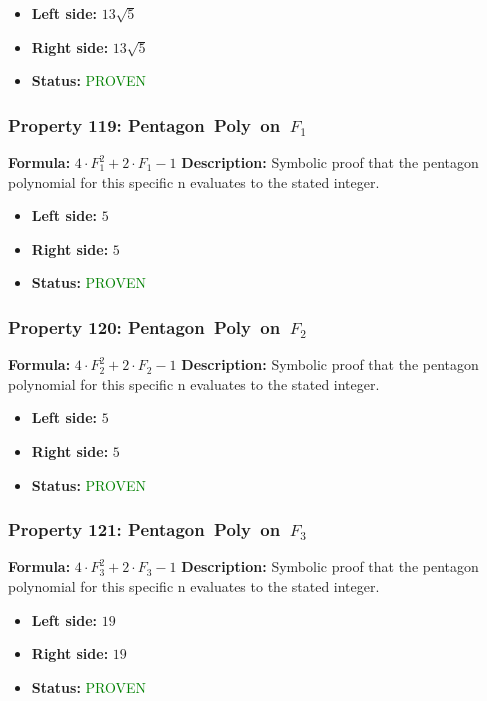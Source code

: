 \begin{itemize}
\item \textbf{Left side:} $13 \sqrt{5}$
\item \textbf{Right side:} $13 \sqrt{5}$
\item \textbf{Status:} \textcolor{green}{PROVEN}
\end{itemize}

\subsubsection*{Property 119: Pentagon~Poly~on~$F_{1}$}
\textbf{Formula:} $4 \cdot F_1^2 + 2 \cdot F_1 - 1$
\textbf{Description:} Symbolic proof that the pentagon polynomial for this specific n evaluates to the stated integer.

\begin{itemize}
\item \textbf{Left side:} $5$
\item \textbf{Right side:} $5$
\item \textbf{Status:} \textcolor{green}{PROVEN}
\end{itemize}

\subsubsection*{Property 120: Pentagon~Poly~on~$F_{2}$}
\textbf{Formula:} $4 \cdot F_2^2 + 2 \cdot F_2 - 1$
\textbf{Description:} Symbolic proof that the pentagon polynomial for this specific n evaluates to the stated integer.

\begin{itemize}
\item \textbf{Left side:} $5$
\item \textbf{Right side:} $5$
\item \textbf{Status:} \textcolor{green}{PROVEN}
\end{itemize}

\subsubsection*{Property 121: Pentagon~Poly~on~$F_{3}$}
\textbf{Formula:} $4 \cdot F_3^2 + 2 \cdot F_3 - 1$
\textbf{Description:} Symbolic proof that the pentagon polynomial for this specific n evaluates to the stated integer.

\begin{itemize}
\item \textbf{Left side:} $19$
\item \textbf{Right side:} $19$
\item \textbf{Status:} \textcolor{green}{PROVEN}
\end{itemize}

